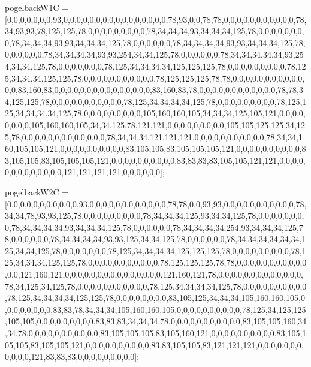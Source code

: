 pogelbackW1C = [0,0,0,0,0,0,0,93,0,0,0,0,0,0,0,0,0,0,0,0,0,0,0,0,78,93,0,0,78,78,0,0,0,0,0,0,0,0,0,0,0,78,34,93,93,78,125,125,78,0,0,0,0,0,0,0,0,0,78,34,34,34,93,34,34,34,125,78,0,0,0,0,0,0,0,0,78,34,34,34,93,93,34,34,34,125,78,0,0,0,0,0,0,78,34,34,34,34,93,93,34,34,34,125,78,0,0,0,0,0,0,78,34,34,34,34,93,93,254,34,34,125,78,0,0,0,0,0,0,78,34,34,34,34,34,93,254,34,34,125,78,0,0,0,0,0,0,0,78,125,34,34,34,34,125,125,125,78,0,0,0,0,0,0,0,0,0,78,125,34,34,34,125,125,78,0,0,0,0,0,0,0,0,0,0,0,78,125,125,125,78,78,0,0,0,0,0,0,0,0,0,0,0,0,0,83,160,83,0,0,0,0,0,0,0,0,0,0,0,0,0,0,0,83,160,83,78,0,0,0,0,0,0,0,0,0,0,0,0,78,78,34,125,125,78,0,0,0,0,0,0,0,0,0,0,0,78,125,34,34,34,34,125,78,0,0,0,0,0,0,0,0,0,78,125,125,34,34,34,34,125,78,0,0,0,0,0,0,0,0,0,105,160,160,105,34,34,34,125,105,121,0,0,0,0,0,0,0,0,105,160,160,105,34,34,125,78,121,121,0,0,0,0,0,0,0,0,0,105,105,125,125,34,125,78,0,0,0,0,0,0,0,0,0,0,0,0,0,78,34,34,34,121,121,121,0,0,0,0,0,0,0,0,0,0,0,78,34,34,160,105,105,121,0,0,0,0,0,0,0,0,0,0,83,105,105,83,105,105,105,121,0,0,0,0,0,0,0,0,0,0,83,105,105,83,105,105,105,121,0,0,0,0,0,0,0,0,0,0,83,83,83,83,105,105,121,121,0,0,0,0,0,0,0,0,0,0,0,0,0,121,121,121,121,0,0,0,0,0,0];

pogelbackW2C = [0,0,0,0,0,0,0,0,0,0,0,93,0,0,0,0,0,0,0,0,0,0,0,0,78,78,0,0,93,93,0,0,0,0,0,0,0,0,0,0,0,78,34,34,78,93,93,125,78,0,0,0,0,0,0,0,0,0,78,34,34,34,125,93,34,34,125,78,0,0,0,0,0,0,0,0,78,34,34,34,34,93,34,34,34,125,78,0,0,0,0,0,0,78,34,34,34,34,254,93,34,34,34,125,78,0,0,0,0,0,0,78,34,34,34,34,93,93,125,34,34,125,78,0,0,0,0,0,0,78,34,34,34,34,34,34,125,34,34,125,78,0,0,0,0,0,0,0,78,125,34,34,34,34,125,125,125,78,0,0,0,0,0,0,0,0,0,78,125,34,34,34,125,125,78,0,0,0,0,0,0,0,0,0,0,0,78,125,125,125,78,78,0,0,0,0,0,0,0,0,0,0,0,0,0,121,160,121,0,0,0,0,0,0,0,0,0,0,0,0,0,0,0,121,160,121,78,0,0,0,0,0,0,0,0,0,0,0,0,0,78,34,125,34,125,78,0,0,0,0,0,0,0,0,0,0,0,78,125,34,34,34,34,125,78,0,0,0,0,0,0,0,0,0,0,78,125,34,34,34,34,125,125,78,0,0,0,0,0,0,0,0,83,105,125,34,34,34,105,160,160,105,0,0,0,0,0,0,0,0,83,83,78,34,34,34,105,160,160,105,0,0,0,0,0,0,0,0,0,0,78,125,34,125,125,105,105,0,0,0,0,0,0,0,0,0,83,83,83,34,34,34,78,0,0,0,0,0,0,0,0,0,0,0,83,105,105,160,34,34,78,0,0,0,0,0,0,0,0,0,0,0,83,105,105,105,83,105,160,121,0,0,0,0,0,0,0,0,0,0,83,105,105,105,83,105,105,121,0,0,0,0,0,0,0,0,0,0,83,83,105,105,83,121,121,121,0,0,0,0,0,0,0,0,0,0,0,121,83,83,83,0,0,0,0,0,0,0,0,0];

